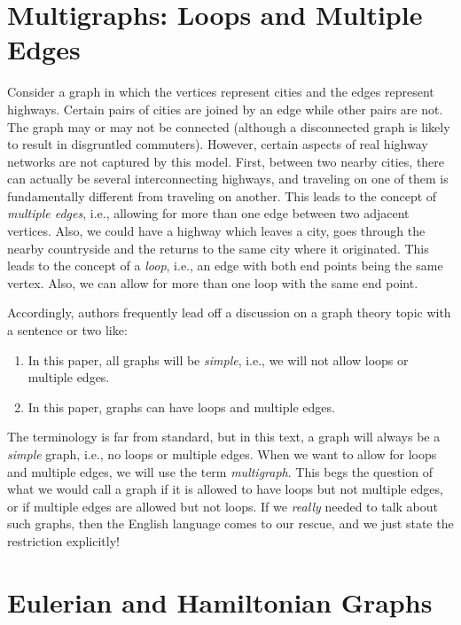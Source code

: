 \section{Multigraphs:  Loops and Multiple Edges}\label{s:graphs:multigraphs}

Consider a graph in which the vertices represent cities and the edges
represent highways.  Certain pairs of cities are joined by an edge
while other pairs are not.  The graph may or may not be connected
(although a disconnected graph is likely to result in disgruntled
commuters).  However, certain aspects of real highway networks are not
captured by this model. First, between two nearby cities, there can
actually be several interconnecting highways, and traveling on one
of them is fundamentally different from traveling on another.  This
leads to the concept of \textit{multiple edges}, i.e., allowing for
more than one edge between two adjacent vertices.  Also, we could have
a highway which leaves a city, goes through the nearby countryside and
the returns to the same city where it originated.  This leads to the
concept of a \textit{loop}, i.e., an edge with both end points being
the same vertex.  Also, we can allow for more than one loop with the
same end point.

Accordingly, authors frequently lead off a discussion on a graph
theory topic with a sentence or two like:
\begin{enumerate}
\item In this paper, all graphs will be \textit{simple}, i.e., we will
  not allow loops or multiple edges.
\item In this paper, graphs can have loops and multiple edges.
\end{enumerate}
The terminology is far from standard, but in this text, a graph will
always be a \textit{simple} graph, i.e., no loops or multiple edges.
When we want to allow for loops and multiple edges, we will use the
term \textit{multigraph}.  This begs the question of what we would
call a graph if it is allowed to have loops but not multiple edges, or
if multiple edges are allowed but not loops.  If we \textit{really}
needed to talk about such graphs, then the English language comes to
our rescue, and we just state the restriction explicitly!

\section{Eulerian and Hamiltonian Graphs}\label{s:graphs:eulerham}

